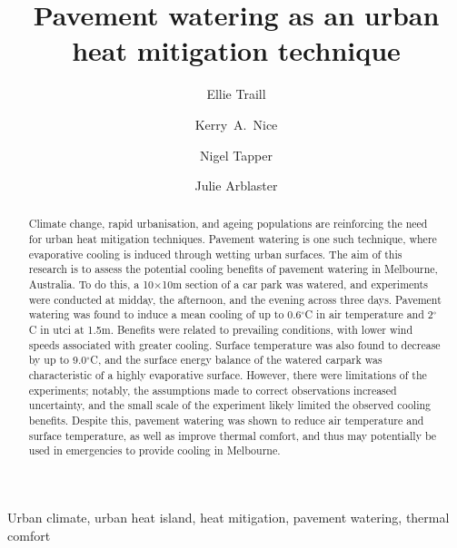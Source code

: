 \documentclass[final,3p,times,authoryear]{elsarticle}
\begin{document}
\title{Pavement watering as an urban heat mitigation technique}

\author[monash]{Ellie Traill}
\author[melb]{Kerry~A.~Nice}

\author[monash]{Nigel Tapper}
\author[monash]{Julie Arblaster}

\address[melb]{Transport, Health, and Urban Design Research Lab, Faculty of Architecture, Building, and Planning, University of Melbourne, VIC, Australia.}
\address[monash]{School of Earth, Atmosphere and Environment, Monash University, Clayton, VIC 3800, Australia.}




\begin{abstract}

Climate change, rapid urbanisation, and ageing populations are reinforcing the need for urban heat mitigation techniques. Pavement watering is one such technique, where evaporative cooling is induced through wetting urban surfaces. The aim of this research is to assess the potential cooling benefits of pavement watering in Melbourne, Australia. To do this, a 10$\times$10m section of a car park was watered, and experiments were conducted at midday, the afternoon, and the evening across three days. Pavement watering was found to induce a mean cooling of up to 0.6$^{\circ}$C in air temperature and 2$^{\circ}$C in \gls{utci} at 1.5m. Benefits were related to prevailing conditions, with lower wind speeds associated with greater cooling. Surface temperature was also found to decrease by up to 9.0$^{\circ}$C, and the surface energy balance of the watered carpark was characteristic of a highly evaporative surface. However, there were limitations of the experiments; notably, the assumptions made to correct observations increased uncertainty, and the small scale of the experiment likely limited the observed cooling benefits. Despite this, pavement watering was shown to reduce air temperature and surface temperature, as well as improve thermal comfort, and thus may potentially be used in emergencies to provide cooling in Melbourne.

\end{abstract}

\begin{keyword}
Urban climate\sep
urban heat island\sep 
heat mitigation\sep 
pavement watering\sep 
thermal comfort
\end{keyword}
\end{document}
